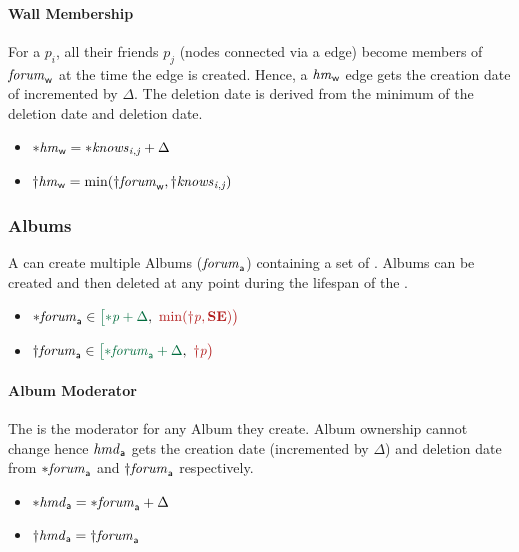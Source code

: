 \paragraph{Wall Membership}
For a \tPerson $p_i$, all their friends $p_j$ (\tPerson nodes connected via a \tKnows edge) become members of $\mathit{forum}_\textsf{w}$ at the time the \tKnows edge is created. Hence, a \tHasMember $\mathit{hm}_{\mathsf{w}}$ edge gets the creation date of \tKnows incremented by $\Delta$. The deletion date is derived from the minimum of the \tForum deletion date and \tKnows deletion date.
\begin{itemize}
    \item ${\ast}\mathit{\mathit{hm}}_{\mathsf{w}} = {\ast}\mathit{\mathit{knows}_{i,j}} + \Delta$
    \item ${\dagger}\mathit{\mathit{hm}}_{\mathsf{w}} = \min({\dagger}\mathit{\mathit{forum}}_{\mathsf{w}}, {\dagger}\mathit{\mathit{knows}_{i,j}})$
\end{itemize}

\subsubsection{Albums}
A \tPerson can create multiple Albums ($\mathit{forum}_\textsf{a}$) containing a set of \tPhotos{}. Albums can be created and then deleted at any point during the lifespan of the \tPerson.
\begin{itemize}
    \item $\varc{\eForum}_\textsf{a} \in \interval{\varc{\ePerson} + \Delta}{\min (\vard{\ePerson}, \xSE)}$
    \item $\vard{\eForum}_\textsf{a} \in \interval{ \varc{\eForum}_\textsf{a} + \Delta}{\vard{\ePerson}}$
\end{itemize}

\paragraph{Album Moderator}
The \tPerson is the moderator for any Album they create. Album ownership cannot change hence \tHasModerator $\mathit{hmd}_{\mathsf{a}}$ gets the creation date (incremented by $\Delta$) and deletion date from ${\ast}\mathit{\mathit{forum}}_\textsf{a}$ and ${\dagger}\mathit{\mathit{forum}}_\textsf{a}$ respectively.
\begin{itemize}
\item ${\ast}\mathit{\mathit{hmd}}_{\mathsf{a}} = {\ast}\mathit{\mathit{forum}}_{\mathsf{a}} + \Delta$
\item ${\dagger}\mathit{\mathit{hmd}}_{\mathsf{a}} = {\dagger}\mathit{\mathit{forum}}_{\mathsf{a}}$
\end{itemize}

